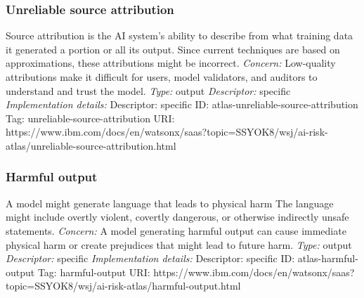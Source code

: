\documentclass{article}
\begin{document}
\subsubsection*{Unreliable source attribution}
Source attribution is the AI system's ability to describe from what training data it generated a portion or all its output. Since current techniques are based on approximations, these attributions might be incorrect.\newline
\textit{Concern: }Low-quality attributions make it difficult for users, model validators, and auditors to understand and trust the model.\newline\newline
\textit{Type: }output\newline
\textit{Descriptor: }specific \newline\newline
\textit{Implementation details:} \newline
Descriptor: specific \newline
ID: atlas-unreliable-source-attribution \newline
Tag: unreliable-source-attribution \newline
URI:  https://www.ibm.com/docs/en/watsonx/saas?topic=SSYOK8/wsj/ai-risk-atlas/unreliable-source-attribution.html\newline
\subsubsection*{Harmful output}
A model might generate language that leads to physical harm The language might include overtly violent, covertly dangerous, or otherwise indirectly unsafe statements.\newline
\textit{Concern: }A model generating harmful output can cause immediate physical harm or create prejudices that might lead to future harm.\newline\newline
\textit{Type: }output\newline
\textit{Descriptor: }specific \newline\newline
\textit{Implementation details:} \newline
Descriptor: specific \newline
ID: atlas-harmful-output \newline
Tag: harmful-output \newline
URI:  https://www.ibm.com/docs/en/watsonx/saas?topic=SSYOK8/wsj/ai-risk-atlas/harmful-output.html\newline
\end{document}
